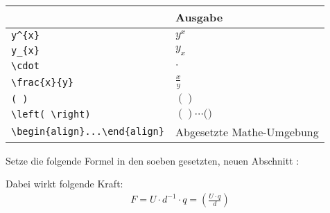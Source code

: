 \documentclass["WS\space 16-17\space -\space LaTeX-Kurs\space -\space Praesentation\space -\space 1.tex"]{subfiles}
\begin{document}
\begin{frame}[fragile]
	\begin{center}
		\begin{tabular}{ll}
			\toprule
			\color{math-cmd}{Mathe}\color{black}{-Befehl}						&	Ausgabe						\\ \midrule
			\lstinline|y^{x}|			&	$y^{x}$						\\
			\lstinline|y_{x}|			&	$y_{x}$						\\
			\lstinline|\cdot|			&	$\cdot$						\\
			\lstinline|\frac{x}{y}|		&	$\frac{x}{y}$				\\ \addlinespace[0.5em]
			\lstinline|( )|				&	$( )$						\\
			\lstinline|\left( \right)|	&	$( ) \cdots \bigg( \bigg)$	\\ \midrule
			\lstinline|\begin{align}...\end{align}|	&	Abgesetzte Mathe-Umgebung	\\
			\bottomrule
		\end{tabular}
	\end{center}
	\pause\btVFill
	\Aufgabee
	Setze die folgende Formel in den soeben gesetzten, neuen Abschnitt :
	\begin{outputbox}
		Dabei wirkt folgende Kraft:
		\begin{align}
			F = U \cdot d^{-1} \cdot q = \left( \frac{U \cdot q}{d} \right)\tag{1}
		\end{align}
	\end{outputbox}
	\vspace{0.3cm}
\end{frame}
\end{document}
